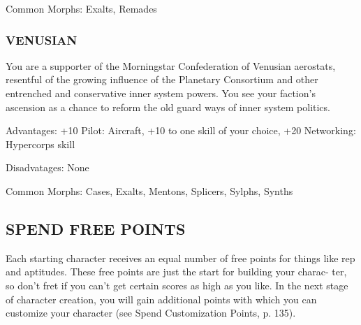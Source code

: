  Common Morphs: Exalts, Remades

\subsubsection{VENUSIAN}
You are a supporter of the Morningstar Confederation of Venusian aerostats, resentful of the growing
influence of the Planetary Consortium and other entrenched and conservative inner system powers. You
see your faction’s ascension as a chance to reform the
old guard ways of inner system politics.

 Advantages: +10 Pilot: Aircraft, +10 to one skill of
your choice, +20 Networking: Hypercorps skill

 Disadvatages: None

 Common Morphs: Cases, Exalts, Mentons, Splicers,
Sylphs, Synths

 \subsection{SPEND FREE POINTS}

 Each starting character receives an equal number of
 free points for things like rep and aptitudes. These
 free points are just the start for building your charac-
 ter, so don’t fret if you can’t get certain scores as high
 as you like. In the next stage of character creation,
 you will gain additional points with which you can
 customize your character (see Spend Customization
 Points, p. 135).


